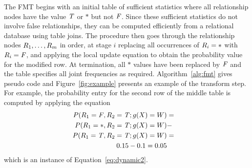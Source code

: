 \documentclass{article}
\begin{document}
The FMT begins with an initial table of sufficient statistics where all relationship nodes have the value $\mathit{T}$ or $*$ but not $\mathit{F}$. Since these sufficient statistics do not involve false relationships, they can be computed efficiently from a relational database using table joins. The procedure then goes through the relationship nodes $R_{1},\ldots,R_{m}$ in order, at stage $i$ replacing all occurrences of $R_{i} = *$ with $R_{i} = \mathit{F}$, and applying the local update equation to obtain the probability value for the modified row.
At termination, all $*$ values have been replaced by $\mathit{F}$ and the table specifies all joint frequencies as required. Algorithm~\ref{alg:fmt} gives pseudo code and Figure~\ref{fig:example} presents an example of the transform step. For example, the probability entry for the second row of the middle table is computed by applying the equation
\begin{eqnarray*}
P(R_{1} = \mathit{F}, R_{2} = \mathit{T}; g(X) = W) & = & \\
 P(R_{1} = *, R_{2} = \mathit{T}; g(X) = W) &- & \\
 P(R_{1} = \mathit{T}, R_{2} = \mathit{T}; g(X) = W) & = &\\
0.15 - 0.1 = 0.05  
\end{eqnarray*}
which is an instance of Equation~\eqref{eq:dynamic2}.
\end{document}

